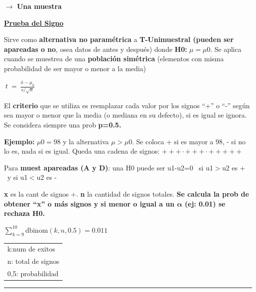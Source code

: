 \documentclass[12pt,a4paper]{article}
\begin{document}
\hfill $\longrightarrow$ \textbf{Una muestra}

\vspace{-6pt}
{\fontsize{17}{20}\selectfont\bfseries\uline{Prueba del Signo}\par}

\begin{minipage}[t]{0.60\textwidth}
\vspace{0pt}
Sirve como \textbf{alternativa no paramétrica} a \textbf{T-Unimuestral (pueden ser apareadas o no}, osea datos de antes y después) donde \textbf{H0:} $\mu = \mu 0$. Se aplica cuando se muestrea de una \textbf{población simétrica} (elementos con misma probabilidad de ser mayor o menor a la media)
\end{minipage}\hfill
\begin{minipage}[t]{0.36\textwidth}
\vspace{10pt}
\begin{center}
\colorbox{blue!7}{$\displaystyle \ t \ = \ \frac{\bar{x}-\mu_0}{s/\sqrt{n}} \ $}
\end{center}
\end{minipage}

El \textbf{criterio} que se utiliza es reemplazar cada valor por los signos ``+'' o ``-'' según sea mayor o menor que la media (o mediana en su defecto), si es igual se ignora. Se considera siempre una prob \textbf{p=0.5.}

\textbf{Ejemplo:} $\mu 0 = 98$ y la alternativa $\mu > \mu 0$. Se coloca + si es mayor a 98, - si no lo es, nada si es igual. Queda una cadena de signos: $+++\cdot+++\cdot+++++$

Para \textbf{muest apareadas (A y D)}: una H0 puede ser u1-u2=0 \ si u1$>$u2 es + \ y si u1$<$u2 es -

\textbf{x} es la cant de signos +. \textbf{n} la cantidad de signos totales. \textbf{Se calcula la prob de obtener ``x'' o más signos y si menor o igual a un $\boldsymbol{\alpha}$ (ej: 0.01) se rechaza H0.}

\begin{center}
\colorbox{yellow!60}{$\displaystyle \sum_{k=9}^{10} \text{dbinom}(k,n,0.5) = 0.011$}
\qquad
{\small
\begin{tabular}{@{}l@{}}
k:num de exitos \\
n: total de signos \\
0,5: probabilidad
\end{tabular}
}
\end{center}

\hrule
\vspace{2pt}
\end{document}
